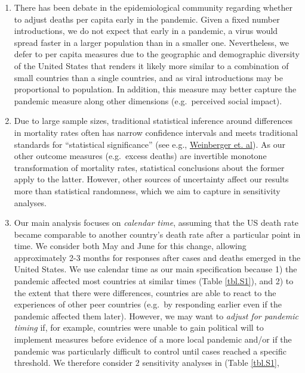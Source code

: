 \documentclass[
]{article}
\providecommand{\tightlist}{%
  \setlength{\itemsep}{0pt}\setlength{\parskip}{0pt}}
\begin{document}
\begin{enumerate}
\def\labelenumi{\arabic{enumi}.}
\tightlist
\item
  There has been debate in the epidemiological community regarding
  whether to adjust deaths per capita early in the pandemic. Given a
  fixed number introductions, we do not expect that early in a pandemic,
  a virus would spread faster in a larger population than in a smaller
  one. Nevertheless, we defer to per capita measures due to the
  geographic and demographic diversity of the United States that renders
  it likely more similar to a combination of small countries than a
  single countries, and as viral introductions may be proportional to
  population. In addition, this measure may better capture the pandemic
  measure along other dimensions (e.g.~perceived social impact).
\item
  Due to large sample sizes, traditional statistical inference around
  differences in mortality rates often has narrow confidence intervals
  and meets traditional standards for ``statistical significance'' (see
  e.g.,
  \href{https://jamanetwork.com/journals/jamainternalmedicine/fullarticle/2767980}{Weinberger et. al}).
  As our other outcome measures (e.g.~excess deaths) are invertible
  monotone transformation of mortality rates, statistical conclusions
  about the former apply to the latter. However, other sources of
  uncertainty affect our results more than statistical randomness, which
  we aim to capture in sensitivity analyses.
\item
  Our main analysis focuses on \emph{calendar time}, assuming that the
  US death rate became comparable to another country's death rate after
  a particular point in time. We consider both May and June for this
  change, allowing approximately 2-3 months for responses after cases
  and deaths emerged in the United States. We use calendar time as our
  main specification because 1) the pandemic affected most countries at
  similar times (Table \ref{tbl.S1}), and 2) to the extent that there
  were differences, countries are able to react to the experiences of
  other peer countries (e.g.~by responding earlier even if the pandemic
  affected them later). However, we may want to
  \emph{adjust for pandemic timing} if, for example, countries were
  unable to gain political will to implement measures before evidence of
  a more local pandemic and/or if the pandemic was particularly
  difficult to control until cases reached a specific threshold. We
  therefore consider 2 sensitivity analyses in (Table \ref{tbl.S1},

\end{enumerate}
\end{document}
